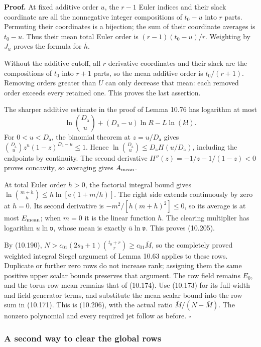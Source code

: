 \documentclass[
  11pt,
  a4paper,
]{article}
\begin{document}
\textbf{Proof.} At fixed additive order \(u\), the \(r-1\) Euler indices
and their slack coordinate are all the nonnegative integer compositions
of \(t_0-u\) into \(r\) parts. Permuting their coordinates is a
bijection; the sum of their coordinate averages is \(t_0-u\). Thus their
mean total Euler order is \((r-1)(t_0-u)/r\). Weighting by \(J_u\)
proves the formula for \(\overline h\).

Without the additive cutoff, all \(r\) derivative coordinates and their
slack are the compositions of \(t_0\) into \(r+1\) parts, so the mean
additive order is \(t_0/(r+1)\). Removing orders greater than \(U\) can
only decrease that mean: each removed order exceeds every retained one.
This proves the last assertion.

The sharper additive estimate in the proof of Lemma 10.76 has logarithm
at most \[
\ln\binom{D_{\mathrm a}}u+(D_{\mathrm a}-u)\ln R-L\ln(k!).
\] For \(0<u<D_{\mathrm a}\), the binomial theorem at
\(z=u/D_{\mathrm a}\) gives
\(\binom{D_{\mathrm a}}u z^u(1-z)^{D_{\mathrm a}-u}\le1\). Hence
\(\ln\binom{D_{\mathrm a}}u\le D_{\mathrm a}H(u/D_{\mathrm a})\),
including the endpoints by continuity. The second derivative
\(H''(z)=-1/z-1/(1-z)<0\) proves concavity, so averaging gives
\(A_{\rm mean}\).

At total Euler order \(h>0\), the factorial integral bound gives
\(\ln\binom{m+h}{h}\le h\ln[\mathrm e(1+m/h)]\). The right side extends
continuously by zero at \(h=0\). Its second derivative is
\(-m^2/[h(m+h)^2]\le0\), so its average is at most \(E_{\rm mean}\);
when \(m=0\) it is the linear function \(h\). The clearing multiplier
has logarithm \(u\ln\mathfrak v\), whose mean is exactly
\(\overline u\ln\mathfrak v\). This proves (10.205).

By (10.190), \(N>c_{01}(2s_0+1)\binom{t_0+r}{r}\ge c_{01}\overline M\),
so the completely proved weighted integral Siegel argument of Lemma
10.63 applies to these rows. Duplicate or further zero rows do not
increase rank; assigning them the same positive upper scalar bounds
preserves that argument. The row field remains \(E_0\), and the
torus-row mean remains that of (10.174). Use (10.173) for its full-width
and field-generator terms, and substitute the mean scalar bound into the
row sum in (10.171). This is (10.206), with the actual ratio
\(\overline M/(N-\overline M)\). The nonzero polynomial and every
required jet follow as before. \(\square\)

\subsubsection{A second way to clear the global
rows}\label{a-second-way-to-clear-the-global-rows}
\end{document}
